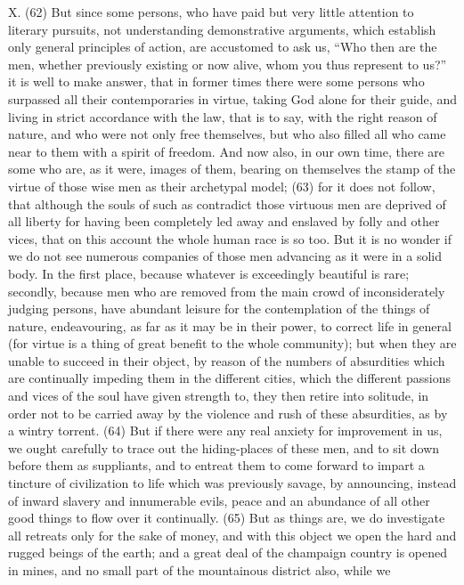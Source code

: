 X. (62) But since some persons, who have paid but very little attention to literary pursuits, not
understanding demonstrative arguments, which establish only general principles of action, are
accustomed to ask us, ``Who then are the men, whether previously existing or now alive, whom you
thus represent to us?'' it is well to make answer, that in former times there were some persons who
surpassed all their contemporaries in virtue, taking God alone for their guide, and living in strict
accordance with the law, that is to say, with the right reason of nature, and who were not only free
themselves, but who also filled all who came near to them with a spirit of freedom. And now also, in
our own time, there are some who are, as it were, images of them, bearing on themselves the
stamp of the virtue of those wise men as their archetypal model; (63) for it does not follow, that
although the souls of such as contradict those virtuous men are deprived of all liberty for having
been completely led away and enslaved by folly and other vices, that on this account the whole
human race is so too. But it is no wonder if we do not see numerous companies of those men
advancing as it were in a solid body. In the first place, because whatever is exceedingly beautiful is
rare; secondly, because men who are removed from the main crowd of inconsiderately judging
persons, have abundant leisure for the contemplation of the things of nature, endeavouring, as far
as it may be in their power, to correct life in general (for virtue is a thing of great benefit to the
whole community); but when they are unable to succeed in their object, by reason of the numbers
of absurdities which are continually impeding them in the different cities, which the different
passions and vices of the soul have given strength to, they then retire into solitude, in order not to
be carried away by the violence and rush of these absurdities, as by a wintry torrent. (64) But if
there were any real anxiety for improvement in us, we ought carefully to trace out the hiding-places
of these men, and to sit down before them as suppliants, and to entreat them to come forward to
impart a tincture of civilization to life which was previously savage, by announcing, instead of
inward slavery and innumerable evils, peace and an abundance of all other good things to flow over
it continually. (65) But as things are, we do investigate all retreats only for the sake of money, and
with this object we open the hard and rugged beings of the earth; and a great deal of the
champaign country is opened in mines, and no small part of the mountainous district also, while we
